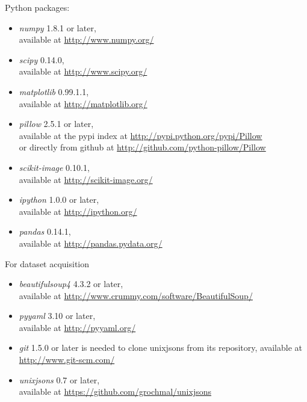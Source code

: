 \documentclass[11pt,a4paper,twoside,openright]{report}
\begin{document}
Python packages:
\begin{itemize}
\item[]\emph{numpy} 1.8.1 or later, \\
available at \href{http://www.numpy.org/}{http://www.numpy.org/}

\item[]\emph{scipy} 0.14.0, \\
available at \href{http://www.scipy.org/}{http://www.scipy.org/}

\item[]\emph{matplotlib} 0.99.1.1, \\
available at \href{http://matplotlib.org/}{http://matplotlib.org/}

\item[]\emph{pillow} 2.5.1 or later, \\
available at the pypi index at
\href{https://pypi.python.org/pypi/Pillow}
{http://pypi.python.org/pypi/Pillow} \\
or directly from github at
\href{http://github.com/python-pillow/Pillow}
{http://github.com/python-pillow/Pillow}

\item[]\emph{scikit-image} 0.10.1, \\
available at \href{http://scikit-image.org/}{http://scikit-image.org/}

\item[]\emph{ipython} 1.0.0 or later, \\
available at \href{http://ipython.org/}{http://ipython.org/}

\item[]\emph{pandas} 0.14.1, \\
available at \href{http://pandas.pydata.org/}{http://pandas.pydata.org/}
\end{itemize}

For dataset acquisition
\begin{itemize}
\item[]\emph{beautifulsoup4} 4.3.2 or later, \\
available at \href{http://www.crummy.com/software/BeautifulSoup/}
{http://www.crummy.com/software/BeautifulSoup/}

\item[]\emph{pyyaml} 3.10 or later, \\
available at \href{http://pyyaml.org/}{http://pyyaml.org/}

\item[]\emph{git} 1.5.0 or later is needed to clone unixjsons from its
repository, available at \href{http://www.git-scm.com/}{http://www.git-scm.com/}

\item[]\emph{unixjsons} 0.7 or later, \\
available at \href{https://github.com/grochmal/unixjsons}
{https://github.com/grochmal/unixjsons}
\end{itemize}
\end{document}
